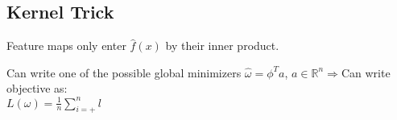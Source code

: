 \subsection{Kernel Trick}

Feature maps only enter $\hat{f}(x)$ by their inner product. 

Can write one of the possible global minimizers $\hat{\omega} = \phi^Ta$, $a \in \mathbb{R}^n \Rightarrow$Can write objective as:\\
$ L(\omega) = \frac{1}{n}\sum_{i=+}^n l$